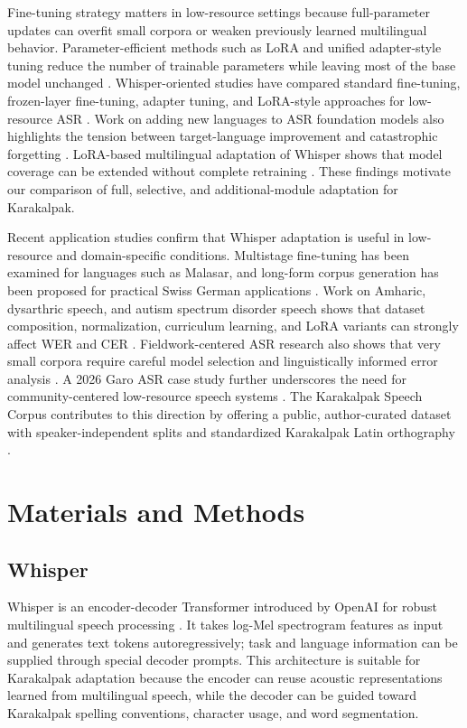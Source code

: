 \documentclass[11pt]{article}
\begin{document}
Fine-tuning strategy matters in low-resource settings because full-parameter updates can overfit small corpora or weaken previously learned multilingual behavior. Parameter-efficient methods such as LoRA and unified adapter-style tuning reduce the number of trainable parameters while leaving most of the base model unchanged \cite{hu2021lora,he2022unified}. Whisper-oriented studies have compared standard fine-tuning, frozen-layer fine-tuning, adapter tuning, and LoRA-style approaches for low-resource ASR \cite{liu2024exploration}. Work on adding new languages to ASR foundation models also highlights the tension between target-language improvement and catastrophic forgetting \cite{qian2024learn}. LoRA-based multilingual adaptation of Whisper shows that model coverage can be extended without complete retraining \cite{xu2024rehearsal,song2024lora}. These findings motivate our comparison of full, selective, and additional-module adaptation for Karakalpak.

Recent application studies confirm that Whisper adaptation is useful in low-resource and domain-specific conditions. Multistage fine-tuning has been examined for languages such as Malasar, and long-form corpus generation has been proposed for practical Swiss German applications \cite{pillai2024multistage,timmel2024swiss}. Work on Amharic, dysarthric speech, and autism spectrum disorder speech shows that dataset composition, normalization, curriculum learning, and LoRA variants can strongly affect WER and CER \cite{gete2025amharic,tan2025cba,park2025asd}. Fieldwork-centered ASR research also shows that very small corpora require careful model selection and linguistically informed error analysis \cite{liang2025fieldwork}. A 2026 Garo ASR case study further underscores the need for community-centered low-resource speech systems \cite{nyalang2026garo}. The Karakalpak Speech Corpus contributes to this direction by offering a public, author-curated dataset with speaker-independent splits and standardized Karakalpak Latin orthography \cite{uteuliev2026karakalpak}.

\section{Materials and Methods}

\subsection{Whisper}

Whisper is an encoder-decoder Transformer introduced by OpenAI for robust multilingual speech processing \cite{radford2023robust}. It takes log-Mel spectrogram features as input and generates text tokens autoregressively; task and language information can be supplied through special decoder prompts. This architecture is suitable for Karakalpak adaptation because the encoder can reuse acoustic representations learned from multilingual speech, while the decoder can be guided toward Karakalpak spelling conventions, character usage, and word segmentation.
\end{document}
